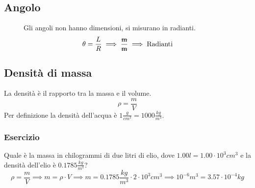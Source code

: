 \documentclass[../../main.tex]{subfiles}
\begin{document}
\subsection{Angolo}
\begin{figure}[h!]
    \begin{minipage}{0.45\linewidth}
    \end{minipage}
    \hfill
    \begin{minipage}{0.5\linewidth}
        Gli angoli non hanno dimensioni, si misurano in radianti.
        \[
            \theta = \frac{L}{R} \implies \dfrac{\text{\sout{m}}}{\text{\sout{m}}} \implies \text{Radianti}
        \]
    \end{minipage}
\end{figure}
\subsection{Densità di massa}
La densità è il rapporto tra la massa e il volume.
\[
    \rho = \frac{m}{V}
\]
Per definizione la densità dell'acqua è $1 \frac{g}{cm^3} = 1000 \frac{kg}{m^3}$.\\
\subsubsection{Esercizio}
Quale è la massa in chilogrammi di due litri di elio, dove $1.00l = 1.00 \cdot 10^3 cm^3$ e la densità dell'elio è $0.1785 \frac{kg}{m^3}$?\\
\[
    \rho = \frac{m}{V} \implies m = \rho \cdot V \implies m = 0.1785 \frac{kg}{m^3} \cdot 2 \cdot 10^{3} cm^3 \implies 10^{-6} m^3 = 3.57 \cdot 10^{-4} kg
\]
\end{document}
